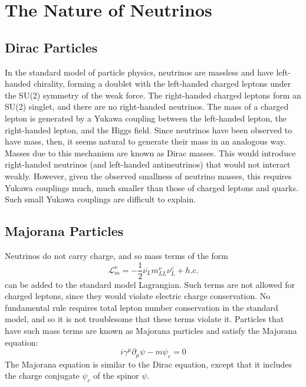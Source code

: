 \documentclass[herrin-thesis.tex]{subfiles}
\begin{document}
\section{The Nature of Neutrinos}
\subsection{Dirac Particles}
In the standard model of particle physics, neutrinos are massless and have left-handed chirality, forming a doublet with the left-handed charged leptons under the SU(2) symmetry of the weak force. The right-handed charged leptons form an SU(2) singlet, and there are no right-handed neutrinos. The mass of a charged lepton is generated by a Yukawa coupling between the left-handed lepton, the right-handed lepton, and the Higgs field. Since neutrinos have been observed to have mass, then, it seems natural to generate their mass in an analogous way. Masses due to this mechanism are known as Dirac masses. This would introduce right-handed neutrinos (and left-handed antineutrinos) that would not interact weakly. However, given the observed smallness of neutrino masses, this requires Yukawa couplings much, much smaller than those of charged leptons and quarks. Such small Yukawa couplings are difficult to explain.

\subsection{Majorana Particles}
Neutrinos do not carry charge, and so mass terms of the form
\begin{equation}
\mathcal{L}_{m}^{\nu} = -\frac{1}{2}\overline{\nu_{L}} m_{L L}^{\nu} \nu_{L}^{c} +h.c.
\label{eq:nu_majorana_lagrangian}
\end{equation}
can be added to the standard model Lagrangian. Such terms are not allowed for charged leptons, since they would violate electric charge conservation. No fundamental rule requires total lepton number conservation in the standard model, and so it is not troublesome that these terms violate it. Particles that have such mass terms are known as Majorana particles and satisfy the Majorana equation:
\begin{equation}
i\gamma^{\mu}\partial_{\mu}\psi - m \psi_{c} = 0
\end{equation}
The Majorana equation is similar to the Dirac equation, except that it includes the charge conjugate \(\psi_c\) of the spinor \(\psi\).
\end{document}
